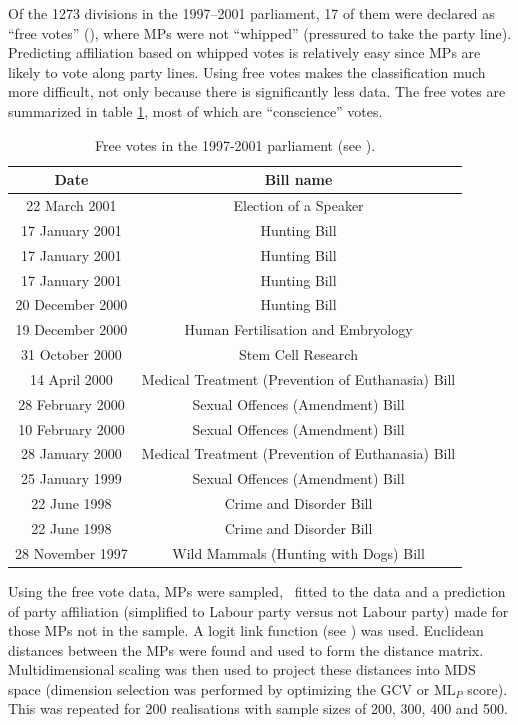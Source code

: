 Of the 1273 divisions in the 1997--2001 parliament, 17 of them were declared  as ``free votes'' (\cite{freevotes}), where MPs were not ``whipped'' (pressured to take the party line). Predicting affiliation based on whipped votes is relatively easy since MPs are likely to vote along party lines. Using free votes makes the classification much more difficult, not only because there is significantly less data. The free votes are summarized in table \ref{free-vote-description}, most of which are ``conscience'' votes.

\begin{table}  
\begin{centering}
\begin{tabular}{cc}
	Date & Bill name \\
    \hline
22 March 2001    &   Election of a Speaker \\
17 January 2001  &   Hunting Bill \\
17 January 2001  &   Hunting Bill \\
17 January 2001  &   Hunting Bill\\
20 December 2000 &   Hunting Bill \\
19 December 2000 &   Human Fertilisation and Embryology\\
31 October 2000  &   Stem Cell Research \\
14 April 2000    &   Medical Treatment (Prevention of Euthanasia) Bill \\
28 February 2000 &   Sexual Offences (Amendment) Bill \\
10 February 2000 &   Sexual Offences (Amendment) Bill \\
28 January 2000  &   Medical Treatment (Prevention of Euthanasia) Bill\\
25 January 1999  &   Sexual Offences (Amendment) Bill\\
22 June 1998     &  Crime and Disorder Bill \\
22 June 1998     &  Crime and Disorder Bill \\
28 November 1997 &  Wild Mammals (Hunting with Dogs) Bill\\
  \end{tabular}
\caption{Free votes in the 1997-2001 parliament (see \cite{freevotes}).}
\label{free-vote-description}
\end{centering}
\end{table}

Using the free vote data, MPs were sampled, \mdsds\ fitted to the data and a prediction of party affiliation (simplified to Labour party versus not Labour party) made for those MPs not in the sample. A logit link function (see ) was used. Euclidean distances between the MPs were found and used to form the distance matrix. Multidimensional scaling was then used to project these distances into MDS space (dimension selection was performed by optimizing the GCV or $\text{ML}_P$ score). This was repeated for 200 realisations with sample sizes of 200, 300, 400 and 500.

